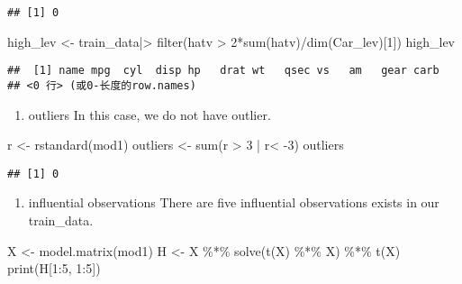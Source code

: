 \documentclass[
]{article}
\newenvironment{Shaded}{\begin{snugshade}}{\end{snugshade}}
\newcommand{\DecValTok}[1]{\textcolor[rgb]{0.00,0.00,0.81}{#1}}
\newcommand{\FunctionTok}[1]{\textcolor[rgb]{0.00,0.00,0.00}{#1}}
\newcommand{\NormalTok}[1]{#1}
\newcommand{\OtherTok}[1]{\textcolor[rgb]{0.56,0.35,0.01}{#1}}
\newcommand{\SpecialCharTok}[1]{\textcolor[rgb]{0.00,0.00,0.00}{#1}}
\providecommand{\tightlist}{%
  \setlength{\itemsep}{0pt}\setlength{\parskip}{0pt}}
\begin{document}
\begin{verbatim}
## [1] 0
\end{verbatim}

\begin{Shaded}
\begin{Highlighting}[]
\NormalTok{high\_lev }\OtherTok{\textless{}{-}}\NormalTok{ train\_data}\SpecialCharTok{|\textgreater{}}
  \FunctionTok{filter}\NormalTok{(hatv }\SpecialCharTok{\textgreater{}} \DecValTok{2}\SpecialCharTok{*}\FunctionTok{sum}\NormalTok{(hatv)}\SpecialCharTok{/}\FunctionTok{dim}\NormalTok{(Car\_lev)[}\DecValTok{1}\NormalTok{])}
\NormalTok{high\_lev}
\end{Highlighting}
\end{Shaded}

\begin{verbatim}
##  [1] name mpg  cyl  disp hp   drat wt   qsec vs   am   gear carb
## <0 行> (或0-长度的row.names)
\end{verbatim}

\begin{enumerate}
\def\labelenumi{(\alph{enumi})}
\setcounter{enumi}{1}
\tightlist
\item
  outliers In this case, we do not have outlier.
\end{enumerate}

\begin{Shaded}
\begin{Highlighting}[]
\NormalTok{r }\OtherTok{\textless{}{-}} \FunctionTok{rstandard}\NormalTok{(mod1)}
\NormalTok{outliers }\OtherTok{\textless{}{-}} \FunctionTok{sum}\NormalTok{(r }\SpecialCharTok{\textgreater{}} \DecValTok{3} \SpecialCharTok{|}\NormalTok{ r}\SpecialCharTok{\textless{}} \SpecialCharTok{{-}}\DecValTok{3}\NormalTok{)}
\NormalTok{outliers}
\end{Highlighting}
\end{Shaded}

\begin{verbatim}
## [1] 0
\end{verbatim}

\begin{enumerate}
\def\labelenumi{(\alph{enumi})}
\setcounter{enumi}{2}
\tightlist
\item
  influential observations There are five influential observations
  exists in our train\_data.
\end{enumerate}

\begin{Shaded}
\begin{Highlighting}[]
\NormalTok{X }\OtherTok{\textless{}{-}} \FunctionTok{model.matrix}\NormalTok{(mod1)}
\NormalTok{H }\OtherTok{\textless{}{-}}\NormalTok{ X }\SpecialCharTok{\%*\%} \FunctionTok{solve}\NormalTok{(}\FunctionTok{t}\NormalTok{(X) }\SpecialCharTok{\%*\%}\NormalTok{ X) }\SpecialCharTok{\%*\%} \FunctionTok{t}\NormalTok{(X)}
\FunctionTok{print}\NormalTok{(H[}\DecValTok{1}\SpecialCharTok{:}\DecValTok{5}\NormalTok{, }\DecValTok{1}\SpecialCharTok{:}\DecValTok{5}\NormalTok{])}
\end{Highlighting}
\end{Shaded}
\end{document}
